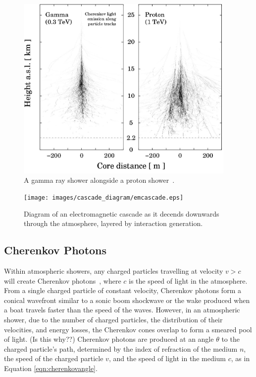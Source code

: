   \begin{figure}[ht]
    \centering
    \includegraphics[width=0.95\textwidth]{images/showers_gamma_proton}
    \caption[Gamma Ray and Proton Showers]{
      A gamma ray shower alongside a proton shower~\cite{Bernlohr2008149}.
    }
    \label{fig:gamma_vs_proton_airshower}
  \end{figure}

  \begin{figure}[ht]
    \centering
    \texttt{[image: images/cascade\_diagram/emcascade.eps]}
    \caption[Electromagnetic Cascade]{
      Diagram of an electromagnetic cascade as it decends downwards through the atmosphere, layered by interaction generation.
    }
    \label{fig:emcascade}
  \end{figure}

  \FloatBarrier

  \subsection{Cherenkov Photons}

  Within atmospheric showers, any charged particles travelling at velocity $v > c$ will create Cherenkov photons~\cite{cherenkov}, where $c$ is the speed of light in the atmosphere.
  From a single charged particle of constant velocity, Cherenkov photons form a conical wavefront similar to a sonic boom shockwave or the wake produced when a boat travels faster than the speed of the waves.
  {\color{red}However, in an atmospheric shower, due to the number of charged particles, the distribution of their velocities, and energy losses, the Cherenkov cones overlap to form a smeared pool of light. (Is this why??)}
  Cherenkov photons are produced at an angle $\theta$ to the charged particle's path, determined by the index of refraction of the medium $n$, the speed of the charged particle $v$, and the speed of light in the medium $c$, as in Equation \ref{eqn:cherenkovangle}.

